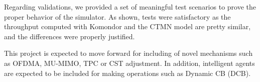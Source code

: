 \documentclass[a4paper]{article}
\begin{document}
Regarding validations, we provided a set of meaningful test scenarios to prove the proper behavior of the simulator. As shown, tests were satisfactory as the throughput computed with Komondor and the CTMN model are pretty similar, and the differences were properly justified.

This project is expected to move forward for including of novel mechanisms such as OFDMA, MU-MIMO, TPC or  CST adjustment. In addition, intelligent agents are expected to be included for making operations such as Dynamic CB (DCB).



\end{document}
